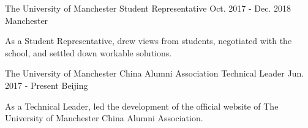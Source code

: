 \begin{cventries}
  \cventry
    {The University of Manchester}
    {Student Representative}
    {Oct. 2017 - Dec. 2018}
    {Manchester}
    {
      \begin{cvitems}
        \item {As a Student Representative, drew views from students, negotiated with the school, and settled down workable solutions.}
      \end{cvitems}
    }
  \cventry
    {The University of Manchester China Alumni Association}
    {Technical Leader}
    {Jun. 2017 - Present}
    {Beijing}
    {
      \begin{cvitems}
        \item {As a Technical Leader, led the development of the official website of The University of Manchester China Alumni Association.}
      \end{cvitems}
    }
\end{cventries}
